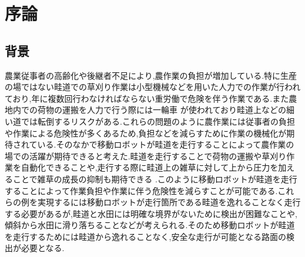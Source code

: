 \chapter{序論}
\section{背景}
農業従事者の高齢化や後継者不足により,農作業の負担が増加している.特に生産の場ではない畦道での草刈り作業は小型機械などを用いた人力での作業が行われており,年に複数回行わなければならない重労働で危険を伴う作業である.また農地内での荷物の運搬を人力で行う際には一輪車
が使われており畦道上などの細い道では転倒するリスクがある.これらの問題のように農作業には従事者の負担や作業による危険性が多くあるため,負担などを減らすために作業の機械化が期待されている.そのなかで移動ロボットが畦道を走行することによって農作業の場での活躍が期待できると考えた.畦道を走行することで荷物の運搬や草刈り作業を自動化できることや,走行する際に畦道上の雑草に対して上から圧力を加えることで雑草の成長の抑制も期待できる\cite{長橋孝哉2019ニューラルネットワークを用いた畦道の雑草検出に関する研究}
.このように移動ロボットが畦道を走行することによって作業負担や作業に伴う危険性を減らすことが可能である.これらの例を実現するには移動ロボットが走行箇所である畦道を逸れることなく走行する必要があるが,畦道と水田には明確な境界がないために検出が困難なことや,傾斜から水田に滑り落ちることなどが考えられる.そのため移動ロボットが畦道を走行するためには畦道から逸れることなく,安全な走行が可能となる路面の検出が必要となる.

%
